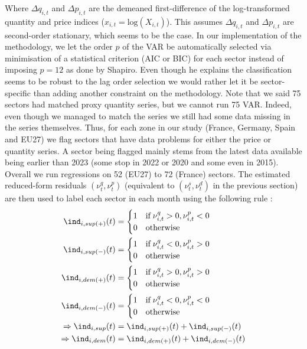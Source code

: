 Where $\Delta q_{i,t}$ and $\Delta p_{i,t}$ are the demeaned first-difference of the log-transformed quantity and price indices ($x_{i,t} = \textrm{log}(X_{i,t})$).
This assumes $\Delta q_{i,t}$ and $\Delta p_{i,t}$ are second-order stationary, which seems to be the case. 
\bigbreak
In our implementation of the methodology, we let the order $p$ of the VAR be automatically selected via minimisation of a statistical criterion (AIC or BIC) for each sector instead of imposing $p=12$ as done by Shapiro.
Even though he explains the classification seems to be robust to the lag order selection we would rather let it be sector-specific than adding another constraint on the methodology.
\bigbreak
Note that we said 75 sectors had matched proxy quantity series, but we cannot run 75 VAR. Indeed, even though we managed to match the series we still had some data missing in the series themselves.
Thus, for each zone in our study (France, Germany, Spain and EU27) we flag sectors that have data problems for either the price or quantity series. A sector being flagged mainly stems from the latest data available being earlier than 2023 (some stop in 2022 or 2020 and some even in 2015).
Overall we run regressions on 52 (EU27) to 72 (France) sectors.
\bigbreak
The estimated reduced-form residuals $(\nu_{t}^{q},\nu_{t}^{p})$ (equivalent to $(\nu_{t}^{s},\nu_{t}^{d})$ in the previous section) are then used to label each sector in each month using the following rule :
\begin{align*}
    \ind_{i,sup(+)}(t) &= \begin{cases} 1 \quad \textrm{if} \; \nu_{i,t}^{q}>0,\nu_{i,t}^{p}<0 \\ 0 \quad \textrm{otherwise} \end{cases} \\
    \ind_{i,sup(-)}(t) &= \begin{cases} 1 \quad \textrm{if} \; \nu_{i,t}^{q}<0,\nu_{i,t}^{p}>0 \\ 0 \quad \textrm{otherwise} \end{cases} \\
    \ind_{i,dem(+)}(t) &= \begin{cases} 1 \quad \textrm{if} \; \nu_{i,t}^{q}>0,\nu_{i,t}^{p}>0 \\ 0 \quad \textrm{otherwise} \end{cases} \\
    \ind_{i,dem(-)}(t) &= \begin{cases} 1 \quad \textrm{if} \; \nu_{i,t}^{q}<0,\nu_{i,t}^{p}<0 \\ 0 \quad \textrm{otherwise} \end{cases} \\
    \Rightarrow \ind_{i,sup}(t) &= \ind_{i,sup(+)}(t) + \ind_{i,sup(-)}(t) \\
    \Rightarrow \ind_{i,dem}(t) &= \ind_{i,dem(+)}(t) + \ind_{i,dem(-)}(t) \\
\end{align*}

